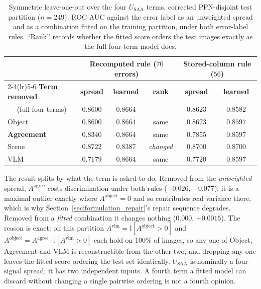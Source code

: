 \documentclass[12pt,a4paper]{report}
\begin{document}
\begin{table}[!htbp]
\centering
\caption[Symmetric leave-one-out over the four $U_{SAA}$ terms, corrected PPN-disjoint test partition]{Symmetric leave-one-out over the four $U_{\text{SAA}}$ terms, corrected PPN-disjoint test partition ($n=249$). ROC-AUC against the error label as an unweighted spread and as a combination fitted on the training partition, under both error-label rules. ``Rank'' records whether the fitted score orders the test images exactly as the full four-term model does.}
\label{tab:agree_ablation}
\small
\begin{tabular}{@{}l cc c cc@{}}
\toprule
& \multicolumn{3}{c}{\textbf{Recomputed rule ($70$ errors)}} & \multicolumn{2}{c}{\textbf{Stored-column rule ($56$)}} \\
\cmidrule(lr){2-4}\cmidrule(lr){5-6}
\textbf{Term removed} & \textbf{spread} & \textbf{learned} & \textbf{rank} & \textbf{spread} & \textbf{learned} \\
\midrule
--- (full four terms) & $0.8600$ & $0.8664$ & --- & $0.8623$ & $0.8582$ \\
Object & $0.8600$ & $0.8664$ & same & $0.8623$ & $0.8597$ \\
\textbf{Agreement} & $\mathbf{0.8340}$ & $\mathbf{0.8664}$ & same & $\mathbf{0.7855}$ & $\mathbf{0.8597}$ \\
Scene & $0.8722$ & $0.8387$ & \emph{changed} & $0.8700$ & $0.8700$ \\
VLM & $0.7179$ & $0.8664$ & same & $0.7720$ & $0.8597$ \\
\bottomrule
\end{tabular}
\end{table}

The result splits by what the term is asked to do. Removed from the \emph{unweighted} spread,
$A^{\text{agree}}$ costs discrimination under both rules ($-0.026$, $-0.077$): it is a maximal
outlier exactly where $A^{\text{object}}=0$ and so contributes real variance there, which is why
Section~\ref{sec:formulation_repair}'s repair sequence degrades. Removed from a \emph{fitted}
combination it changes nothing ($0.000$, $+0.0015$). The reason is exact: on this partition
$A^{\text{vlm}} = \mathbb{I}[A^{\text{object}}>0]$ and $A^{\text{object}} =
A^{\text{agree}}\cdot\mathbb{I}[A^{\text{vlm}}>0]$ each hold on $100\%$ of images, so any one of
Object, Agreement and VLM is reconstructible from the other two, and dropping any one leaves the
fitted score ordering the test set identically. $U_{\text{SAA}}$ is nominally a four-signal spread;
it has two independent inputs. A fourth term a fitted model can discard without changing a single
pairwise ordering is not a fourth opinion.
\end{document}
